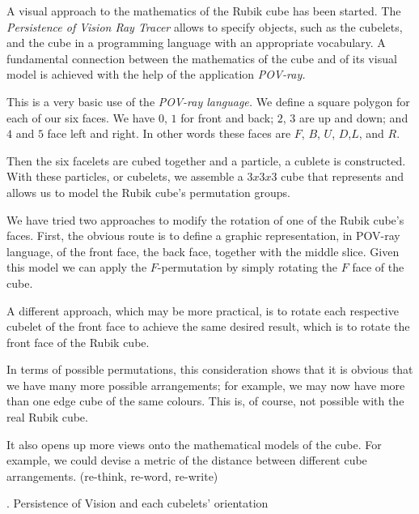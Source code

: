 {%
A visual approach to the mathematics of the Rubik cube has been started.\dd
The {\sl Persistence of Vision Ray Tracer} allows to specify objects, such as
the cubelets, and the cube in a programming language with an appropriate
vocabulary.  A fundamental connection between the mathematics of the cube and
of its\break
visual model is achieved with the help of the application {\sl POV-ray.}

This is a very basic use of the {\sl POV-ray language.}  We define a square polygon
for each of our six faces.  We have $0$, $1$ for front and back; $2$, $3$ are up and down;
and $4$ and $5$ face left and right. In other words these faces are $F$, $B$, $U$,
$D$,$L$, and $R$.

Then the six facelets are cubed together and a particle, a cublete is constructed.
With these particles, or cubelets, we assemble a $3x3x3$ cube that represents and
allows us to model the Rubik cube's permutation groups.

We have tried two approaches to modify the rotation of one of the Rubik cube's faces.
First, the obvious route is to define a graphic representation,
in POV-ray language, of the front face, the back face, together with the middle slice.
Given this model we can apply the $F$-permutation by simply rotating
the $F$ face of the cube.

\e A different approach, which may be more practical, is to rotate each respective
cubelet of the front face to achieve the same desired result, which is to rotate the
front face of the Rubik cube.

In terms of possible permutations, this consideration shows that it is obvious that
we have many more possible arrangements; for example, we may now have more than one
edge cube of the same colours.  This is, of course, not possible with the
real Rubik cube.

It also opens up more views onto the mathematical models of the cube.  For example,
we could devise a metric of the distance between different cube arrangements.
(re-think, re-word, re-write)

}%
\vfill\eject
{}. Persistence of Vision and each cubelets' orientation

